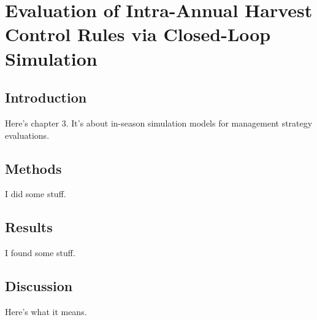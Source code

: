 \documentclass[12pt,]{book}
\theoremstyle{definition}
\theoremstyle{definition}
\theoremstyle{definition}
\theoremstyle{remark}
\begin{document}
\setlength{\parskip}{0pt plus 0pt minus 0pt}

\doublespacing

\chapter{Evaluation of Intra-Annual Harvest Control Rules via
Closed-Loop Simulation}\label{ch3}

\section{Introduction}\label{introduction}

Here's chapter 3. It's about in-season simulation models for management
strategy evaluations.

\section{Methods}\label{methods}

I did some stuff.

\section{Results}\label{results}

I found some stuff.

\section{Discussion}\label{discussion}

Here's what it means.
\end{document}
